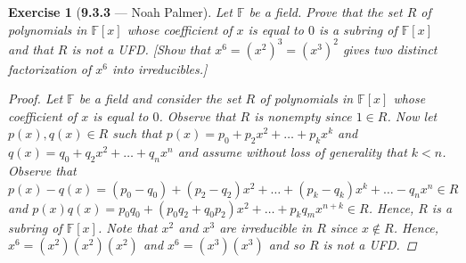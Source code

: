 \documentclass[12pt]{amsart}
\newtheorem{exercise}[theorem]{Exercise}
\theoremstyle{remark}
\newcommand{\FF}{{\mathbb F}}
\theoremstyle{mycomment}
\begin{document}
\begin{exercise}[\textbf{9.3.3} --- Noah Palmer] Let $\FF$ be a field. Prove that the set $R$ of polynomials in $\FF[x]$ whose coefficient of $x$ is equal to $0$ is a subring of $\FF[x]$ and that $R$ is not a UFD. [Show that $x^6=(x^2)^3=(x^3)^2$ gives two distinct factorization of $x^6$ into irreducibles.]
  \begin{proof}
  Let $\FF$ be a field and consider the set $R$ of polynomials in $\FF[x]$ whose coefficient of $x$ is equal to $0$. Observe that $R$ is nonempty since $1\in R$. Now let $p(x),q(x)\in R$ such that $p(x)=p_0+p_2x^2+\ldots+p_kx^k$ and $q(x)=q_0+q_2x^2+\ldots+q_nx^n$ and  assume without loss of generality that $k<n$. Observe that $p(x)-q(x)=(p_0-q_0)+(p_2-q_2)x^2+\ldots+(p_k-q_k)x^k+\ldots-q_nx^n\in R$ and $p(x)q(x)=p_0q_0+(p_0q_2+q_0p_2)x^2+\ldots+p_kq_mx^{n+k}\in R$. Hence, $R$ is a subring of $\FF[x]$. Note that $x^2$ and $x^3$ are irreducible in $R$ since $x\not\in R$. Hence, $x^6=(x^2)(x^2)(x^2)$ and $x^6=(x^3)(x^3)$ and so $R$ is not a UFD.
  \end{proof}
  \end{exercise}
  \vspace{.15in}
\end{document}
